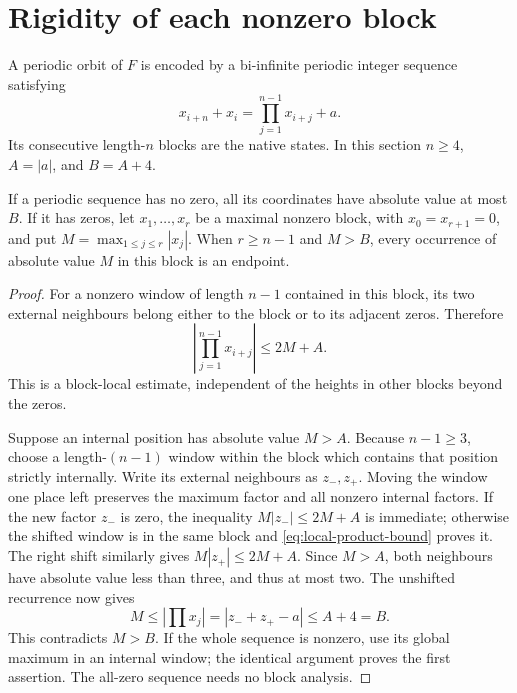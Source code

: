 \section{Rigidity of each nonzero block}
\label{sec:blocks}

A periodic orbit of $F$ is encoded by a bi-infinite periodic integer
sequence satisfying
\begin{equation}
 x_{i+n}+x_i=\prod_{j=1}^{n-1}x_{i+j}+a.
 \label{eq:recurrence}
\end{equation}
Its consecutive length-$n$ blocks are the native states. In this
section $n\ge4$, $A=|a|$, and $B=A+4$.

\begin{lemma}
\label{lem:internal}
If a periodic sequence has no zero, all its coordinates have absolute
value at most $B$. If it has zeros, let
$x_1,\ldots,x_r$ be a maximal nonzero block, with
$x_0=x_{r+1}=0$, and put $M=\max_{1\le j\le r}|x_j|$.
When $r\ge n-1$ and $M>B$, every occurrence of absolute value $M$
in this block is an endpoint.
\end{lemma}
\begin{proof}
For a nonzero window of length $n-1$ contained in this block,
its two external neighbours belong either to the block or to its
adjacent zeros. Therefore
\begin{equation}
 \left|\prod_{j=1}^{n-1}x_{i+j}\right|\le2M+A.
 \label{eq:local-product-bound}
\end{equation}
This is a block-local estimate, independent of the heights in other
blocks beyond the zeros.

Suppose an internal position has absolute value $M>A$. Because
$n-1\ge3$, choose a length-$(n-1)$ window within the block which
contains that position strictly internally. Write its external
neighbours as $z_-,z_+$. Moving the window one place left preserves
the maximum factor and all nonzero internal factors. If the new
factor $z_-$ is zero, the inequality $M|z_-|\le2M+A$ is immediate;
otherwise the shifted window is in the same block and
\eqref{eq:local-product-bound} proves it. The right shift similarly
gives $M|z_+|\le2M+A$.
Since $M>A$, both neighbours have absolute value less than three,
and thus at most two. The unshifted recurrence now gives
\[
 M\le\left|\prod x_j\right|=|z_-+z_+-a|\le A+4=B.
\]
This contradicts $M>B$. If the whole sequence is nonzero, use its
global maximum in an internal window; the identical argument proves
the first assertion. The all-zero sequence needs no block analysis.
\end{proof}

